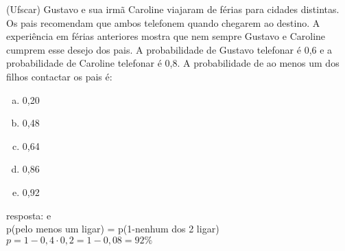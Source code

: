 \begin{ex}
(Ufscar) Gustavo e sua irmã Caroline viajaram de férias para cidades distintas. Os pais recomendam que ambos telefonem quando chegarem ao destino. A experiência em férias anteriores mostra que nem sempre Gustavo e Caroline cumprem esse desejo dos pais. A probabilidade de Gustavo telefonar é 0,6 e a probabilidade de Caroline telefonar é 0,8. A probabilidade de ao menos um dos filhos contactar os pais é:
   \begin{enumerate}[(a)]
   \item 0,20
   \item 0,48
   \item 0,64
   \item 0,86
   \item 0,92
   \end{enumerate}
    \begin{sol}
     resposta: e \\
     p(pelo menos um ligar) = p(1-nenhum dos 2 ligar) \\
     $p=1-0,4\cdot0,2=1-0,08=92\%$
    \end{sol}
\end{ex}